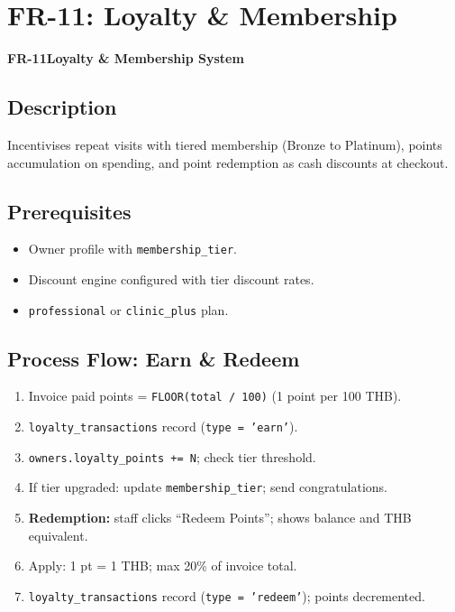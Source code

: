 \documentclass[12pt,a4paper]{report}
\newcommand{\moduleheader}[2]{%
  \par\vspace{6pt}%
  \noindent\colorbox{branddark}{\color{white}\textbf{\small #1}}\quad\textbf{\large #2}%
  \par\vspace{4pt}%
}
\begin{document}
\chapter{FR-11: Loyalty \& Membership}

\moduleheader{FR-11}{Loyalty \& Membership System}

\section{Description}

Incentivises repeat visits with tiered membership (Bronze to Platinum), points accumulation on spending, and point redemption as cash discounts at checkout.

\section{Prerequisites}

\begin{itemize}
  \item Owner profile with \texttt{membership\_tier}.
  \item Discount engine configured with tier discount rates.
  \item \texttt{professional} or \texttt{clinic\_plus} plan.
\end{itemize}

\section{Process Flow: Earn \& Redeem}

\begin{enumerate}
  \item Invoice paid \textrightarrow{} points = \texttt{FLOOR(total / 100)} (1 point per 100 THB).
  \item \texttt{loyalty\_transactions} record (\texttt{type = 'earn'}).
  \item \texttt{owners.loyalty\_points += N}; check tier threshold.
  \item If tier upgraded: update \texttt{membership\_tier}; send congratulations.
  \item \textbf{Redemption:} staff clicks ``Redeem Points''; shows balance and THB equivalent.
  \item Apply: 1 pt = 1 THB; max 20\% of invoice total.
  \item \texttt{loyalty\_transactions} record (\texttt{type = 'redeem'}); points decremented.
\end{enumerate}
\end{document}
